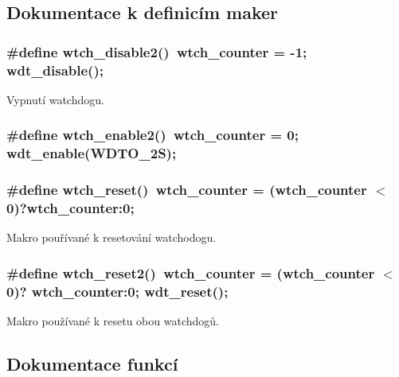 \subsection{Dokumentace k definicím maker}
\subsubsection[{wtch\_\-disable2}]{\setlength{\rightskip}{0pt plus 5cm}\#define wtch\_\-disable2()~{\bf wtch\_\-counter} = -\/1; wdt\_\-disable();}\label{watchdog_8h_a7a047399f54a574f9f9c6c477cc1cdd5}


Vypnutí watchdogu. 
\subsubsection[{wtch\_\-enable2}]{\setlength{\rightskip}{0pt plus 5cm}\#define wtch\_\-enable2()~{\bf wtch\_\-counter} = 0; wdt\_\-enable(WDTO\_\-2S);}\label{watchdog_8h_ab6f29e0682cc95138fa8de612c529b43}
\subsubsection[{wtch\_\-reset}]{\setlength{\rightskip}{0pt plus 5cm}\#define wtch\_\-reset()~{\bf wtch\_\-counter} = ({\bf wtch\_\-counter} $<$ 0)?wtch\_\-counter:0;}\label{watchdog_8h_a838ac15df7e81187dbe205888842548c}


Makro pouřívané k resetování watchodogu. 
\subsubsection[{wtch\_\-reset2}]{\setlength{\rightskip}{0pt plus 5cm}\#define wtch\_\-reset2()~{\bf wtch\_\-counter} = ({\bf wtch\_\-counter} $<$ 0)? wtch\_\-counter:0; wdt\_\-reset();}\label{watchdog_8h_aec7bb1ec2da2c0cd4a620e8201652167}


Makro používané k resetu obou watchdogů. 

\subsection{Dokumentace funkcí}
